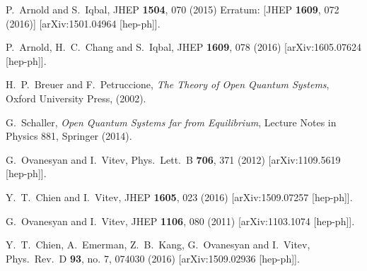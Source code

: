 \documentclass[letter,11pt]{article}
\begin{document}
\begin{thebibliography}{99}
  P.~Arnold and S.~Iqbal,
  JHEP {\bf 1504}, 070 (2015)
  Erratum: [JHEP {\bf 1609}, 072 (2016)]
  [arXiv:1501.04964 [hep-ph]].

  P.~Arnold, H.~C.~Chang and S.~Iqbal,
  JHEP {\bf 1609}, 078 (2016)
  [arXiv:1605.07624 [hep-ph]].

  H.~P.~Breuer and F.~Petruccione,
  {\it The Theory of Open Quantum Systems}, 
  Oxford University Press, (2002).
  
G.~Schaller,
{\it Open Quantum Systems far from Equilibrium},
Lecture Notes in Physics 881, Springer (2014).

  G.~Ovanesyan and I.~Vitev,
  Phys.\ Lett.\ B {\bf 706}, 371 (2012)
  [arXiv:1109.5619 [hep-ph]].
  
  
  Y.~T.~Chien and I.~Vitev,
  JHEP {\bf 1605}, 023 (2016)
  [arXiv:1509.07257 [hep-ph]].

  G.~Ovanesyan and I.~Vitev,
  JHEP {\bf 1106}, 080 (2011)
  [arXiv:1103.1074 [hep-ph]].

  Y.~T.~Chien, A.~Emerman, Z.~B.~Kang, G.~Ovanesyan and I.~Vitev,
  Phys.\ Rev.\ D {\bf 93}, no. 7, 074030 (2016)
  [arXiv:1509.02936 [hep-ph]].


\end{thebibliography}
\end{document}
